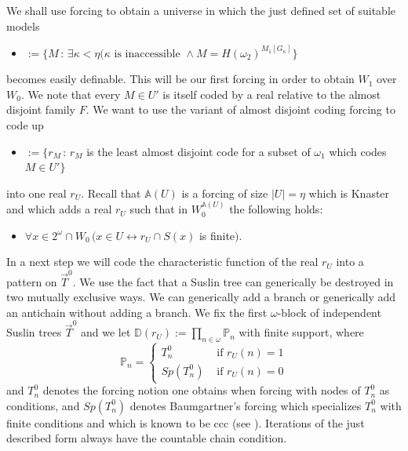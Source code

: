 \documentclass[a4paper,11pt]{article}
\newcommand{\forceP}{\mathbb{P}}
\begin{document}
We shall use forcing to obtain a universe in which the just defined set of suitable models 
\begin{itemize}
\item[$U'$]
$:=\{ M \, : \, \exists \kappa < \eta (\kappa \text{ is inaccessible } \land M=H(\omega_2)^{M_1[G_{\kappa}]} \}$
\end{itemize} 
becomes easily definable. 
This will be our first forcing in order to obtain $W_1$ over $W_0$. We note that every $M \in U'$ is itself coded by a real relative to the almost disjoint family $F$. We want to use  the variant of almost disjoint coding forcing to code up  \begin{itemize}
\item[$U$] $:= \{ r_M \, : \, r_M $ is the least almost disjoint code for a subset of $\omega_1$ which codes $M \in U' \}$
\end{itemize}
into one real $r_{U}$. Recall that $\mathbb{A}(U)$ is a forcing of size $|U|=\eta$ which is Knaster and which adds a real $r_U$ such that in $W_0^{\mathbb{A}(U)}$ the following holds:
\begin{itemize}
\item[$(\ast)$] $\forall x \in 2^{\omega} \cap W_0 \,( x \in U \leftrightarrow r_U \cap S(x)$ is finite$)$.
\end{itemize}
In a next step we will code the characteristic function of the real $r_U$ into a pattern on $\vec{T}^0$. We use the fact that a Suslin tree can generically be destroyed in two mutually exclusive ways. We can generically add a branch or generically add an antichain without adding a branch.
We fix the first $\omega$-block of independent Suslin trees $\vec{T}^0$ and we let 
$\mathbb{D} (r_U) := \prod_{n \in \omega} \forceP_n$ with finite support, where
\begin{equation*}
\forceP_n = \begin{cases}
T^{0}_n  & \text{ if } r_U(n)=1 \\ Sp(T^{0}_n) & \text{ if } r_U(n)=0
\end{cases}
\end{equation*}
and $T^{0}_n$ denotes the forcing notion one obtains when forcing with nodes of $T^{0}_n$ as conditions, and
$Sp(T^{0}_n)$ denotes Baumgartner's forcing which specializes $T^{0}_n$ with finite conditions and which is known to be ccc (see \cite{Jech}).
Iterations of the just described form always have the countable chain condition.
\end{document}
